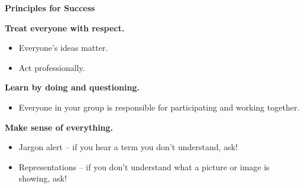 \documentclass[]{article}
\begin{document}
\begin{PresentSpace}
\begin{center}
	\textbf{Principles for Success}
\end{center}
\textbf{Treat everyone with respect.}
\begin{itemize}
	\item Everyone's ideas matter.
	\item Act professionally.
\end{itemize}
\textbf{Learn by doing and questioning.}
\begin{itemize}
	\item Everyone in your group is responsible for participating and working together.
\end{itemize}
\textbf{Make sense of everything.}
\begin{itemize}
	\item Jargon alert -- if you hear a term you don't understand, ask!
	\item Representations -- if you don't understand what a picture or image is showing, ask!
\end{itemize}
\end{PresentSpace}
\end{document}
